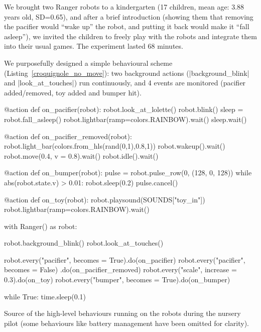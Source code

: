 \documentclass[a4paper, 10pt, conference]{ieeeconf}      %
\begin{document}
We brought two Ranger robots to a kindergarten (17 children, mean age: 3.88
years old, SD=0.65), and after a brief introduction (showing them that removing
the pacifier would ``wake up'' the robot, and putting it back would make it
``fall asleep''), we invited the children to freely play with the robots and
integrate them into their usual games. The experiment lasted 68 minutes.

We purposefully designed a simple behavioural scheme
(Listing~\ref{croquignole_no_move}): two background actions
(\python|background_blink| and \python|look_at_touches|) run continuously, and 4
events are monitored (pacifier added/removed, toy added and bumper hit).

\begin{listing}[h!]

\begin{pythoncode}
    @action
    def on_pacifier(robot):
        robot.look_at_lolette()
        robot.blink()
        sleep = robot.fall_asleep()
        robot.lightbar(ramp=colors.RAINBOW).wait()
        sleep.wait()
    
    @action
    def on_pacifier_removed(robot):
        robot.light_bar(colors.from_hls(rand(0,1),0.8,1))
        robot.wakeup().wait()
        robot.move(0.4, v = 0.8).wait()
        robot.idle().wait()
    
    @action
    def on_bumper(robot):
        pulse = robot.pulse_row(0, (128, 0, 128))
        while abs(robot.state.v) > 0.01:
            robot.sleep(0.2)
        pulse.cancel()
    
    @action
    def on_toy(robot):
        robot.playsound(SOUNDS["toy_in"])
        robot.lightbar(ramp=colors.RAINBOW).wait()
    
    with Ranger() as robot:
    
        robot.background_blink()
        robot.look_at_touches()
    
        robot.every("pacifier", becomes = True).do(on_pacifier)
        robot.every("pacifier", becomes = False)
                                       .do(on_pacifier_removed)
        robot.every("scale", increase = 0.3).do(on_toy)
        robot.every("bumper", becomes = True).do(on_bumper)
    
        while True:
            time.sleep(0.1)
\end{pythoncode}
\caption{Source of the high-level behaviours running on the robots during the
nursery pilot (some behaviours like battery management have been omitted for
clarity).}
\label{croquignole_no_move}
\end{listing}
\end{document}
